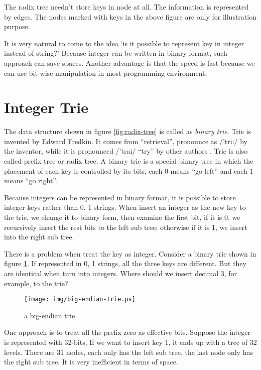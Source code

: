 \documentclass{article}
\begin{document}
The radix tree needn't store keys in node at all. The
information is represented by edges. The nodes marked with keys
in the above figure are only for illustration purpose.

It is very natural to come to the idea `is it possible to represent
key in integer instead of string?' Because integer can be written in
binary format, such approach can save spaces. Another advantage is
that the speed is fast because we can use bit-wise manipulation in
most programming environment.

\section{Integer Trie}
\label{int-trie}

The data structure shown in figure \ref{fig:radix-tree} is
called as \emph{binary trie}.
Trie is invented by Edward Fredkin. It comes from ``retrieval'', pronounce
as /'tri:/ by the inventor, while it is pronounced /'trai/ ``try''
by other authors \cite{wiki-trie}. Trie is also called prefix tree or
radix tree.
A binary
trie is a special binary tree in which the placement of each key is controlled by
its bits, each 0 means ``go left'' and each 1 means ``go
right''\cite{okasaki-int-map}.

Because integers can be represented in binary format, it is
possible to store integer keys rather than 0, 1 strings. When insert an
integer as the new key to the trie, we change it to binary form, then examine
the first bit, if it is 0, we recursively
insert the rest bits to the left sub tree; otherwise if it is 1, we insert
into the right sub tree.

There is a problem when treat the key as integer. Consider a binary
trie shown in figure \ref{fig:big-endian-trie}. If represented in
0, 1 strings, all the three keys are different. But they are identical when
turn into integers. Where should we insert decimal 3, for example, to the trie?

\begin{figure}[htbp]
  \centering
  \texttt{[image: img/big-endian-trie.ps]}
  \caption{a big-endian trie} \label{fig:big-endian-trie}
\end{figure}

One approach is to treat all the prefix zero as effective bits.
Suppose the integer is represented with 32-bits, If we want to insert key 1,
it ends up with a tree of 32 levels.
There are 31 nodes, each only has the left sub tree. the last node only has
the right sub tree. It is very inefficient in terms of space.
\end{document}
